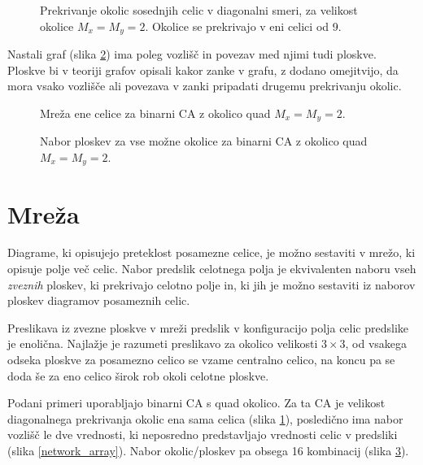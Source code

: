 \documentclass[12pt,a4paper,openany,twoside]{book}
\begin{document}
\begin{figure}[htb]
\centerline{}
\caption[Prekrivanje okolic \(2 \times 2\) - diagonalno.]
{Prekrivanje okolic sosednjih celic v diagonalni smeri, za velikost okolice \(M_x=M_y=2\).
Okolice se prekrivajo v eni celici od 9.}
\label{overlap_diagonal_quad}
\end{figure}

Nastali graf (slika \ref{network_single}) ima poleg vozlišč in povezav med njimi tudi ploskve.
Ploskve bi v teoriji grafov opisali kakor zanke v grafu, z dodano omejitvijo,
da mora vsako vozlišče ali povezava v zanki pripadati drugemu prekrivanju okolic.

\begin{figure}[htb]
\centerline{}
\caption[Mreža ene celice.]{Mreža ene celice za binarni CA z okolico quad \(M_x=M_y=2\).}
\label{network_single}
\end{figure}

\begin{figure}[htb]
\centerline{}
\caption[Nabor ploskev.]{Nabor ploskev za vse možne okolice za binarni CA z okolico quad \(M_x=M_y=2\).}
\label{neighborhood_surfaces}
\end{figure}

\section{Mreža}

Diagrame, ki opisujejo preteklost posamezne celice, je možno sestaviti v mrežo,
ki opisuje polje več celic. Nabor predslik celotnega polja je ekvivalenten naboru
vseh \textit{zveznih} ploskev, ki prekrivajo celotno polje in, ki jih je možno sestaviti iz
naborov ploskev diagramov posameznih celic.

Preslikava iz zvezne ploskve v mreži predslik v konfiguracijo polja celic predslike je enolična.
Najlažje je razumeti preslikavo za okolico velikosti \(3 \times 3\),
od vsakega odseka ploskve za posamezno celico se vzame centralno celico,
na koncu pa se doda še za eno celico širok rob okoli celotne ploskve.

Podani primeri uporabljajo binarni CA s quad okolico.
Za ta CA je velikost diagonalnega prekrivanja okolic ena sama celica (slika \ref{overlap_diagonal_quad}),
posledično ima nabor vozlišč le dve vrednosti, ki neposredno predstavljajo
vrednosti celic v predsliki (slika \ref{network_array}).
Nabor okolic/ploskev pa obsega 16 kombinacij (slika \ref{neighborhood_surfaces}).
\end{document}
